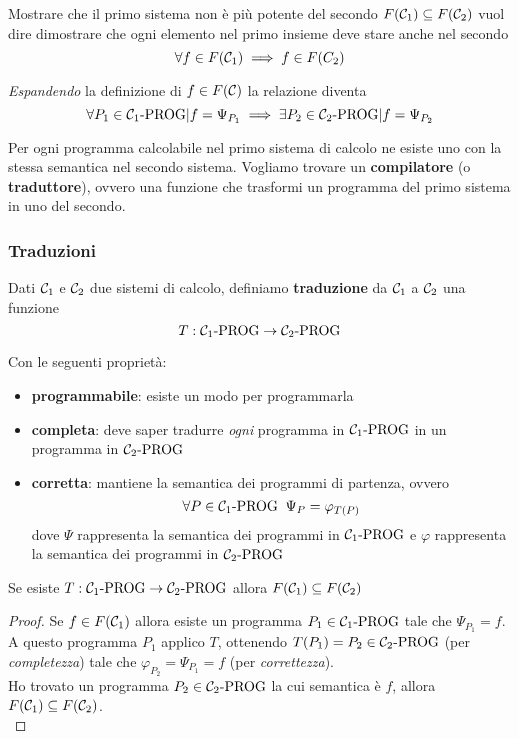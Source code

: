 Mostrare che il primo sistema non è più potente del secondo $F(\mathcal{C}_1) \subseteq F(\mathcal{C}_2)$ vuol dire dimostrare che ogni elemento nel primo insieme deve stare anche nel secondo
$$ \forall f \in F(\mathcal{C}_1) \implies f \in F(C_2) $$

\textit{Espandendo} la definizione di $f \in F(\mathcal{C})$ la relazione diventa
$$ \forall P_1 \in \mathcal{C}_{1}\text{-}\text{PROG} | f = \Psi_{P_1} \implies \exists P_2 \in \mathcal{C}_{2}\text{-}\text{PROG} | f = \Psi_{P_2} $$

Per ogni programma calcolabile nel primo sistema di calcolo ne esiste uno con la stessa semantica nel secondo sistema. Vogliamo trovare un \textbf{compilatore} (o \textbf{traduttore}), ovvero una funzione che trasformi un programma del primo sistema in uno del secondo.\\

\subsubsection{Traduzioni}
Dati $\mathcal{C}_1$ e $\mathcal{C}_2$ due sistemi di calcolo, definiamo \textbf{traduzione} da $\mathcal{C}_1$ a $\mathcal{C}_2$ una funzione
$$ T: \mathcal{C}_{1}\text{-}\text{PROG} \rightarrow \mathcal{C}_{2}\text{-}\text{PROG} $$

Con le seguenti proprietà:
\begin{itemize}
	\item \textbf{programmabile}: esiste un modo per programmarla
	\item \textbf{completa}: deve saper tradurre \textit{ogni} programma in $\mathcal{C}_{1}\text{-}\text{PROG}$ in un programma in $\mathcal{C}_{2}\text{-}\text{PROG}$
	\item \textbf{corretta}: mantiene la semantica dei programmi di partenza, ovvero
	$$ \forall P \in \mathcal{C}_{1}\text{-}\text{PROG} \;\; \Psi_P = \varphi_{T(P)}$$
	dove $\Psi$ rappresenta la semantica dei programmi in $\mathcal{C}_{1}\text{-}\text{PROG}$ e $\varphi$ rappresenta la semantica dei programmi in $\mathcal{C}_{2}\text{-}\text{PROG}$\\
\end{itemize}


\begin{theor}
	Se esiste $T: \mathcal{C}_{1}\text{-}\text{PROG} \rightarrow \mathcal{C}_{2}\text{-}\text{PROG}$ allora $F(\mathcal{C}_1) \subseteq F(\mathcal{C}_2)$
\end{theor}
\begin{proof}
	Se $f \in F(\mathcal{C}_1)$ allora esiste un programma $P_1 \in \mathcal{C}_{1}\text{-}\text{PROG}$ tale che $\Psi_{P_1} = f$.\\
	
	A questo programma $P_1$ applico $T$, ottenendo $T(P_1) = P_2 \in \mathcal{C}_{2}\text{-}\text{PROG}$ (per \textit{completezza}) tale che $\varphi_{P_2} = \Psi_{P_1} = f$ (per \textit{correttezza}).\\
	
	Ho trovato un programma $P_2 \in \mathcal{C}_{2}\text{-}\text{PROG}$ la cui semantica è $f$, allora $F(\mathcal{C}_1) \subseteq F(\mathcal{C}_2)$.\\
\end{proof}


